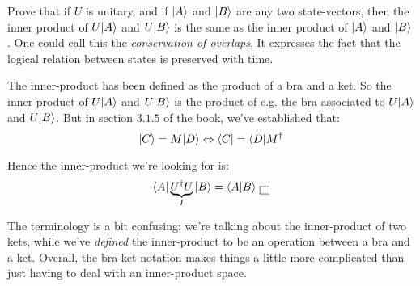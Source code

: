 \documentclass[solutions.tex]{subfiles}
\begin{document}
\maketitle
\begin{exercise} Prove that if $U$ is unitary, and if $|A\rangle$
and $|B\rangle$ are any two state-vectors, then the inner product
of $U|A\rangle$ and $U|B\rangle$ is the same as the inner product of
$|A\rangle$ and $|B\rangle$. One could call this the \textit{conservation
of overlaps}. It expresses the fact that the logical relation between
states is preserved with time.
\end{exercise}
The inner-product has been defined as the product of a bra and a ket.
So the inner-product of $U|A\rangle$ and $U|B\rangle$ is the product of e.g.
the bra associated to $U|A\rangle$ and $U|B\rangle$. But in section $3.1.5$
of the book, we've established that:
\[
	|C\rangle = M|D\rangle \Leftrightarrow \langle C| = \langle D|M^\dagger
\]

Hence the inner-product we're looking for is:
\[
	\langle A|\underbrace{U^\dagger U}_{I}|B\rangle = \left\langle A \middle| B \right\rangle \,\boxed{\,}
\]

\begin{remark} The terminology is a bit confusing: we're talking
about the inner-product of two kets, while we've \textit{defined}
the inner-product to be an operation between a bra and a ket. Overall,
the bra-ket notation makes things a little more complicated than just
having to deal with an inner-product space.
\end{remark}
\end{document}
